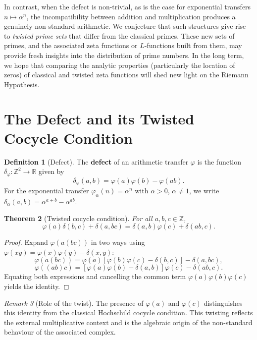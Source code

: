 \documentclass[11pt,a4paper]{article}
\theoremstyle{plain}
\newtheorem{theorem}{Theorem}[section]
\theoremstyle{definition}
\newtheorem{definition}[theorem]{Definition}
\theoremstyle{remark}
\newtheorem{remark}[theorem]{Remark}
\newcommand{\ZZ}{\mathbb{Z}}
\newcommand{\RR}{\mathbb{R}}
\begin{document}
	In contrast, when the defect is non-trivial, as is the case for exponential transfers $n\mapsto\alpha^n$, the incompatibility between addition and multiplication produces a genuinely non-standard arithmetic. We conjecture that such structures give rise to \emph{twisted prime sets} that differ from the classical primes. These new sets of primes, and the associated zeta functions or $L$-functions built from them, may provide fresh insights into the distribution of prime numbers. In the long term, we hope that comparing the analytic properties (particularly the location of zeros) of classical and twisted zeta functions will shed new light on the Riemann Hypothesis.
	
	\section{The Defect and its Twisted Cocycle Condition}
	\label{sec:defect}
	\begin{definition}[Defect]
		\label{def:defect}
		The \textbf{defect} of an arithmetic transfer $\varphi$ is the function $\delta_\varphi:\ZZ^2\to\RR$ given by
		\[
		\delta_\varphi(a,b)=\varphi(a)\varphi(b)-\varphi(ab).
		\]
		For the exponential transfer $\varphi_\alpha(n)=\alpha^n$ with $\alpha>0$, $\alpha\neq 1$, we write $\delta_\alpha(a,b)=\alpha^{a+b}-\alpha^{ab}$.
	\end{definition}
	
	\begin{theorem}[Twisted cocycle condition]
		\label{thm:cocycle}
		For all $a,b,c\in\ZZ$,
		\[
		\varphi(a)\delta(b,c)+\delta(a,bc)=\delta(a,b)\varphi(c)+\delta(ab,c).
		\]
	\end{theorem}
	
	\begin{proof}
		Expand $\varphi(a(bc))$ in two ways using $\varphi(xy)=\varphi(x)\varphi(y)-\delta(x,y)$:
		\[
		\varphi(a(bc))=\varphi(a)[\varphi(b)\varphi(c)-\delta(b,c)]-\delta(a,bc),
		\]
		\[
		\varphi((ab)c)=[\varphi(a)\varphi(b)-\delta(a,b)]\varphi(c)-\delta(ab,c).
		\]
		Equating both expressions and cancelling the common term $\varphi(a)\varphi(b)\varphi(c)$ yields the identity.
	\end{proof}
	
	\begin{remark}[Role of the twist]
		The presence of $\varphi(a)$ and $\varphi(c)$ distinguishes this identity from the classical Hochschild cocycle condition. This twisting reflects the external multiplicative context and is the algebraic origin of the non-standard behaviour of the associated complex.
	\end{remark}
	
\end{document}
